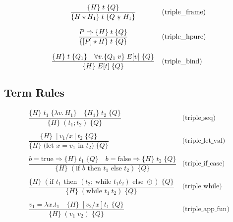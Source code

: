 \documentclass[10pt,a4paper]{article}
\newcommand{\qstar}{\text{ \d{$\star$} }} %
\newcommand{\triple}[3]{\{#2\}\;#1\;\{#3\}}
\begin{document}
\begin{multicols}{2}
\[\begin{array}{cl}
\dfrac{\triple{t}{H}{Q}}
  {\triple{t}{H \star H_1}{Q \qstar H_1}}  & \text{(triple\_frame)} \\
  \\
  
\dfrac{P \Rightarrow \triple{t}{H}{Q}}
  {\triple{t}{[P] \star H}{Q}}  & \text{(triple\_hpure)} \\
  \\

\dfrac{\triple{t}{H}{Q_1} \quad \forall v.\triple{E[v]}{Q_1\;v}{Q}}
{\triple{E[t]}{H}{Q}} & \text{(triple\_bind)} \\  
\end{array}
\]

\subsection*{Term Rules}

\[
\begin{array}{cl}
\dfrac{\triple{t_1}{H}{\lambda v.\,H_1} \quad \triple{t_2}{H_1}{Q}}
  {\triple{(t_1; t_2)}{H}{Q}} & \text{(triple\_seq)} \\
  \\
\dfrac{\triple{[v_1/x]t_2}{H}{Q}}
{\triple{\text{(let }x = v_1\text{ in }t_2\text{)}}{H}{Q}} & \text{(triple\_let\_val)} \\
\\
\dfrac{b = \text{true} \Rightarrow \triple{t_1}{H}{Q} \quad b = \text{false} \Rightarrow \triple{t_2}{H}{Q}}
  {\triple{(\text{if }b\text{ then }t_1\text{ else }t_2)}{H}{Q}} & \text{(triple\_if\_case)} \\
  \\


\dfrac{
\triple{(\text{if } t_1 \text{ then } (t_2;~\text{while } t_1 t_2) \text{ else } \odot)}{H}{Q}
}
  {\triple{(\text{while } t_1~t_2)}{H}{Q}} & \text{(triple\_while)} \\
  \\

  \dfrac{v_1 = \lambda{x}.t_1 \quad \triple{[v_2/x]t_1}{H}{Q}}
  {\triple{(v_1\;v_2)}{H}{Q}} & \text{(triple\_app\_fun)} \\
  \\


\end{array}\]
\end{multicols}
\end{document}
